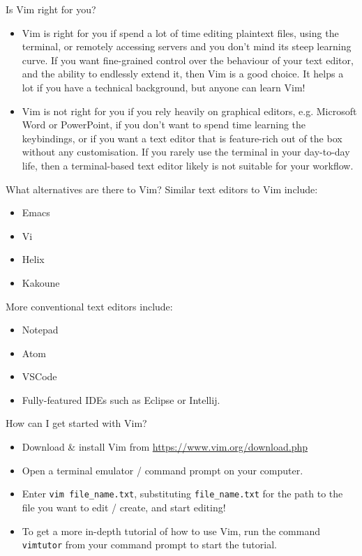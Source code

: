 \documentclass[]{beamer}
\begin{document}
\begin{frame}{Is Vim right for you?}
    \begin{itemize}
        \item   Vim is right for you if spend a lot of time editing plaintext files, using the terminal, or remotely
                accessing servers and you don't mind its steep learning curve. 
                If you want fine-grained control over the behaviour of your text editor, and the ability to endlessly
                extend it, then Vim is a good choice.
                It helps a lot if you have a technical background, but anyone can learn Vim!
        \item   Vim is not right for you if you rely heavily on graphical editors, e.g. Microsoft Word or PowerPoint, if
                you don't want to spend time learning the keybindings, or if you want a text editor that is feature-rich 
                out of the box without any customisation.
                If you rarely use the terminal in your day-to-day life, then a terminal-based text editor likely is not
                suitable for your workflow.
    \end{itemize}
\end{frame}

\begin{frame}{What alternatives are there to Vim?}
    Similar text editors to Vim include:
    \begin{itemize}
        \item   Emacs
        \item   Vi
        \item   Helix
        \item   Kakoune
    \end{itemize}

    More conventional text editors include:
    \begin{itemize}
        \item   Notepad
        \item   Atom
        \item   VSCode
        \item   Fully-featured IDEs such as Eclipse or Intellij.
    \end{itemize}
\end{frame}

\begin{frame}{How can I get started with Vim?}
    \begin{itemize}
        \item   Download \& install Vim from \url{https://www.vim.org/download.php}
        \item   Open a terminal emulator / command prompt on your computer.
        \item   Enter \texttt{vim file\_name.txt}, substituting \texttt{file\_name.txt} for the path to the file you
                want to edit / create, and start editing!
        \item   To get a more in-depth tutorial of how to use Vim, run the command \texttt{vimtutor} from your command
                prompt to start the tutorial.
    \end{itemize}
\end{frame}
\end{document}
